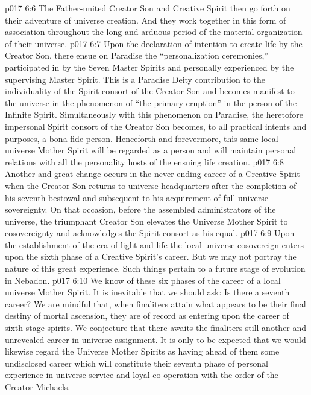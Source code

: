 \vs p017 6:6 The Father\hyp{}united Creator Son and Creative Spirit then go forth on their adventure of universe creation. And they work together in this form of association throughout the long and arduous period of the material organization of their universe.
\pc \vs p017 6:7 \bibnobreakspace {} Upon the declaration of intention to create life by the Creator Son, there ensue on Paradise the “personalization ceremonies,” participated in by the Seven Master Spirits and personally experienced by the supervising Master Spirit. This is a Paradise Deity contribution to the individuality of the Spirit consort of the Creator Son and becomes manifest to the universe in the phenomenon of “the primary eruption” in the person of the Infinite Spirit. Simultaneously with this phenomenon on Paradise, the heretofore impersonal Spirit consort of the Creator Son becomes, to all practical intents and purposes, a bona fide person. Henceforth and forevermore, this same local universe Mother Spirit will be regarded as a person and will maintain personal relations with all the personality hosts of the ensuing life creation.
\pc \vs p017 6:8 \bibnobreakspace {} Another and great change occurs in the never\hyp{}ending career of a Creative Spirit when the Creator Son returns to universe headquarters after the completion of his seventh bestowal and subsequent to his acquirement of full universe sovereignty. On that occasion, before the assembled administrators of the universe, the triumphant Creator Son elevates the Universe Mother Spirit to cosovereignty and acknowledges the Spirit consort as his equal.
\pc \vs p017 6:9 \bibnobreakspace {} Upon the establishment of the era of light and life the local universe cosovereign enters upon the sixth phase of a Creative Spirit’s career. But we may not portray the nature of this great experience. Such things pertain to a future stage of evolution in Nebadon.
\pc \vs p017 6:10 \bibnobreakspace {} We know of these six phases of the career of a local universe Mother Spirit. It is inevitable that we should ask: Is there a seventh career? We are mindful that, when finaliters attain what appears to be their final destiny of mortal ascension, they are of record as entering upon the career of sixth\hyp{}stage spirits. We conjecture that there awaits the finaliters still another and unrevealed career in universe assignment. It is only to be expected that we would likewise regard the Universe Mother Spirits as having ahead of them some undisclosed career which will constitute their seventh phase of personal experience in universe service and loyal co\hyp{}operation with the order of the Creator Michaels.
